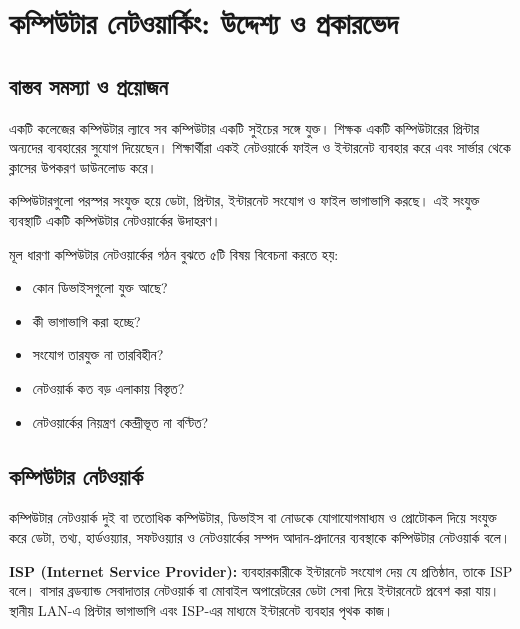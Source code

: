 \begingroup
\chTwoReadableTopicStyle
\section{কম্পিউটার নেটওয়ার্কিং: উদ্দেশ্য ও প্রকারভেদ}

\subsection{বাস্তব সমস্যা ও প্রয়োজন}

একটি কলেজের কম্পিউটার ল্যাবে সব কম্পিউটার একটি সুইচের সঙ্গে যুক্ত। শিক্ষক একটি কম্পিউটারের প্রিন্টার অন্যদের ব্যবহারের সুযোগ দিয়েছেন। শিক্ষার্থীরা একই নেটওয়ার্কে ফাইল ও ইন্টারনেট ব্যবহার করে এবং সার্ভার থেকে ক্লাসের উপকরণ ডাউনলোড করে।

কম্পিউটারগুলো পরস্পর সংযুক্ত হয়ে ডেটা, প্রিন্টার, ইন্টারনেট সংযোগ ও ফাইল ভাগাভাগি করছে। এই সংযুক্ত ব্যবস্থাটি একটি কম্পিউটার নেটওয়ার্কের উদাহরণ।

\begin{keypointbox}{মূল ধারণা}
কম্পিউটার নেটওয়ার্কের গঠন বুঝতে ৫টি বিষয় বিবেচনা করতে হয়:
\begin{itemize}
\item কোন ডিভাইসগুলো যুক্ত আছে?
\item কী ভাগাভাগি করা হচ্ছে?
\item সংযোগ তারযুক্ত না তারবিহীন?
\item নেটওয়ার্ক কত বড় এলাকায় বিস্তৃত?
\item নেটওয়ার্কের নিয়ন্ত্রণ কেন্দ্রীভূত না বণ্টিত?
\end{itemize}
\end{keypointbox}

\subsection{কম্পিউটার নেটওয়ার্ক}

\begin{definitionbox}{কম্পিউটার নেটওয়ার্ক}
দুই বা ততোধিক কম্পিউটার, ডিভাইস বা নোডকে যোগাযোগমাধ্যম ও প্রোটোকল দিয়ে সংযুক্ত করে ডেটা, তথ্য, হার্ডওয়্যার, সফটওয়্যার ও নেটওয়ার্কের সম্পদ আদান-প্রদানের ব্যবস্থাকে কম্পিউটার নেটওয়ার্ক বলে।
\end{definitionbox}

\textbf{ISP (Internet Service Provider):} ব্যবহারকারীকে ইন্টারনেট সংযোগ দেয় যে প্রতিষ্ঠান, তাকে ISP বলে। বাসার ব্রডব্যান্ড সেবাদাতার নেটওয়ার্ক বা মোবাইল অপারেটরের ডেটা সেবা দিয়ে ইন্টারনেটে প্রবেশ করা যায়। স্থানীয় LAN-এ প্রিন্টার ভাগাভাগি এবং ISP-এর মাধ্যমে ইন্টারনেট ব্যবহার পৃথক কাজ।


